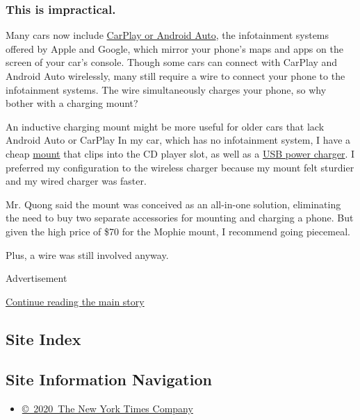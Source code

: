 \hypertarget{this-is-impractical}{%
\subsubsection{This is impractical.}\label{this-is-impractical}}

Many cars now include
\href{https://www.nytimes3xbfgragh.onion/2018/02/01/business/car-navigation-systems-apps.html}{CarPlay
or Android Auto}, the infotainment systems offered by Apple and Google,
which mirror your phone's maps and apps on the screen of your car's
console. Though some cars can connect with CarPlay and Android Auto
wirelessly, many still require a wire to connect your phone to the
infotainment systems. The wire simultaneously charges your phone, so why
bother with a charging mount?

An inductive charging mount might be more useful for older cars that
lack Android Auto or CarPlay In my car, which has no infotainment
system, I have a cheap
\href{https://thewirecutter.com/reviews/best-smartphone-car-mount/}{mount}
that clips into the CD player slot, as well as a
\href{https://thewirecutter.com/reviews/best-usb-car-charger/}{USB power
charger}. I preferred my configuration to the wireless charger because
my mount felt sturdier and my wired charger was faster.

Mr. Quong said the mount was conceived as an all-in-one solution,
eliminating the need to buy two separate accessories for mounting and
charging a phone. But given the high price of \$70 for the Mophie mount,
I recommend going piecemeal.

Plus, a wire was still involved anyway.

Advertisement

\protect\hyperlink{after-bottom}{Continue reading the main story}

\hypertarget{site-index}{%
\subsection{Site Index}\label{site-index}}

\hypertarget{site-information-navigation}{%
\subsection{Site Information
Navigation}\label{site-information-navigation}}

\begin{itemize}
\tightlist
\item
  \href{https://help.nytimes3xbfgragh.onion/hc/en-us/articles/115014792127-Copyright-notice}{©~2020~The
  New York Times Company}
\end{itemize}

